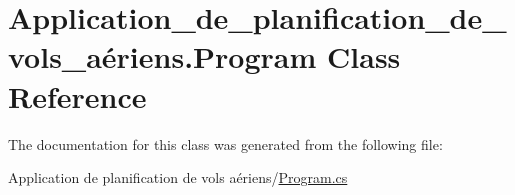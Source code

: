 \hypertarget{class_application__de__planification__de__vols__a_xC3_xA9riens_1_1_program}{}\section{Application\+\_\+de\+\_\+planification\+\_\+de\+\_\+vols\+\_\+aériens.\+Program Class Reference}
\label{class_application__de__planification__de__vols__a_xC3_xA9riens_1_1_program}


The documentation for this class was generated from the following file\+:\begin{DoxyCompactItemize}
\item 
Application de planification de vols aériens/\hyperlink{_program_8cs}{Program.\+cs}\end{DoxyCompactItemize}
